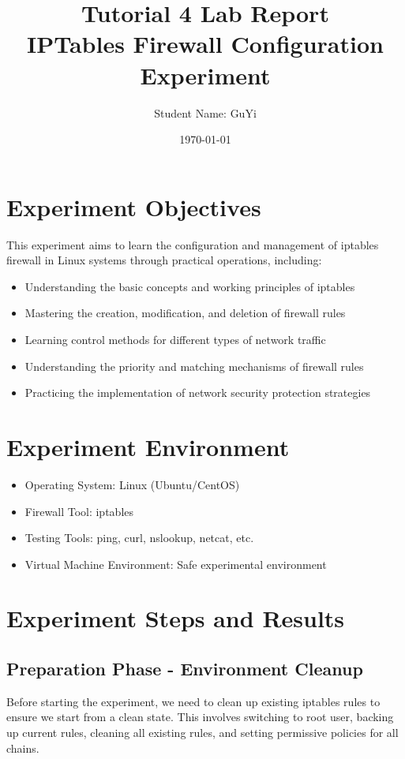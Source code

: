 \documentclass[12pt,a4paper]{article}
\title{\textbf{Tutorial 4 Lab Report} \\ IPTables Firewall Configuration Experiment}
\author{Student Name: GuYi}
\date{\today}
\begin{document}
\maketitle

\section{Experiment Objectives}
This experiment aims to learn the configuration and management of iptables firewall in Linux systems through practical operations, including:
\begin{itemize}
    \item Understanding the basic concepts and working principles of iptables
    \item Mastering the creation, modification, and deletion of firewall rules
    \item Learning control methods for different types of network traffic
    \item Understanding the priority and matching mechanisms of firewall rules
    \item Practicing the implementation of network security protection strategies
\end{itemize}

\section{Experiment Environment}
\begin{itemize}
    \item Operating System: Linux (Ubuntu/CentOS)
    \item Firewall Tool: iptables
    \item Testing Tools: ping, curl, nslookup, netcat, etc.
    \item Virtual Machine Environment: Safe experimental environment
\end{itemize}

\section{Experiment Steps and Results}

\subsection{Preparation Phase - Environment Cleanup}

Before starting the experiment, we need to clean up existing iptables rules to ensure we start from a clean state. This involves switching to root user, backing up current rules, cleaning all existing rules, and setting permissive policies for all chains.
\end{document}
